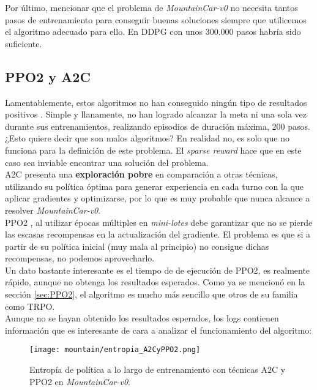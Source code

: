 \documentclass[11pt,fleqn]{book} %
\begin{document}
Por último, mencionar que el problema de \textit{MountainCar-v0} no necesita tantos pasos de entrenamiento para conseguir buenas soluciones siempre que utilicemos el algoritmo adecuado para ello. En DDPG con unos 300.000 pasos habría sido suficiente.

\subsection{PPO2 y A2C}

Lamentablemente, estos algoritmos no han conseguido ningún tipo de resultados positivos \cite{article:sparse}. Simple y llanamente, no han logrado alcanzar la meta ni una sola vez durante sus entrenamientos, realizando episodios de duración máxima, 200 pasos. \\

¿Esto quiere decir que son malos algoritmos? En realidad no, es solo que no funciona para la definición de este problema. El \textit{sparse reward} hace que en este caso sea inviable encontrar una solución del problema. \\

A2C presenta una \textbf{exploración pobre} en comparación a otras técnicas, utilizando su política óptima para generar experiencia en cada turno con la que aplicar gradientes y optimizarse, por lo que es muy probable que nunca alcance a resolver \textit{MountainCar-v0}. \\

PPO2 , al utilizar épocas múltiples en \textit{mini-lotes} debe garantizar que no se pierde las escasas recompensas en la actualización del gradiente. El problema es que si a partir de su política inicial (muy mala al principio) no consigue dichas recompensas, no podemos aprovecharlo. \\

Un dato bastante interesante es el tiempo de de ejecución de PPO2, es realmente rápido, aunque no obtenga los resultados esperados. Como ya se mencionó en la sección \ref{sec:PPO2}, el algoritmo es mucho más sencillo que otros de su familia como TRPO. \\

Aunque no se hayan obtenido los resultados esperados, los logs contienen información que es interesante de cara a analizar el funcionamiento del algoritmo:

\begin{figure}[H]
	\centering\texttt{[image: mountain/entropia\_A2CyPPO2.png]}
	\caption{Entropía de política a lo largo de entrenamiento con técnicas A2C y PPO2 en \textit{MountainCar-v0}.}
	\label{fig:entropiaA2CyPPO2} %
\end{figure}
\end{document}
